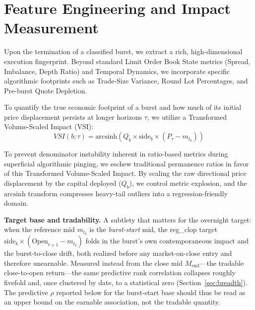 \documentclass[11pt]{article}
\begin{document}
\section{Feature Engineering and Impact Measurement}
\label{sec:features}
Upon the termination of a classified burst, we extract a rich, high-dimensional execution fingerprint. Beyond standard Limit Order Book State metrics (Spread, Imbalance, Depth Ratio) and Temporal Dynamics, we incorporate specific algorithmic footprints such as Trade-Size Variance, Round Lot Percentages, and Pre-burst Quote Depletion.

To quantify the true economic footprint of a burst and how much of its initial price displacement persists at longer horizons $\tau$, we utilize a Transformed Volume-Scaled Impact (VSI):
\begin{equation}
VSI(b; \tau) = \text{arcsinh} \left( Q_{b} \times \text{side}_{b} \times (P_{\tau} - m_{t_{b}}) \right)
\end{equation}

To prevent denominator instability inherent in ratio-based metrics during superficial algorithmic pinging, we eschew traditional permanence ratios in favor of this Transformed Volume-Scaled Impact. By scaling the raw directional price displacement by the capital deployed ($Q_b$), we control metric explosion, and the $\text{arcsinh}$ transform compresses heavy-tail outliers into a regression-friendly domain.

\textbf{Target base and tradability.} A subtlety that matters for the overnight target: when the reference mid $m_{t_b}$ is the \emph{burst-start} mid, the reg\_clop target $\text{side}_b\times(\text{Open}_{t+1}-m_{t_b})$ folds in the burst's own contemporaneous impact and the burst-to-close drift, both realized before any market-on-close entry and therefore unearnable. Measured instead from the close mid $M_{\text{end}}$---the tradable close-to-open return---the same predictive rank correlation collapses roughly fivefold and, once clustered by date, to a statistical zero (Section~\ref{sec:breadth}). The predictive $\rho$ reported below for the burst-start base should thus be read as an upper bound on the earnable association, not the tradable quantity.
\end{document}
